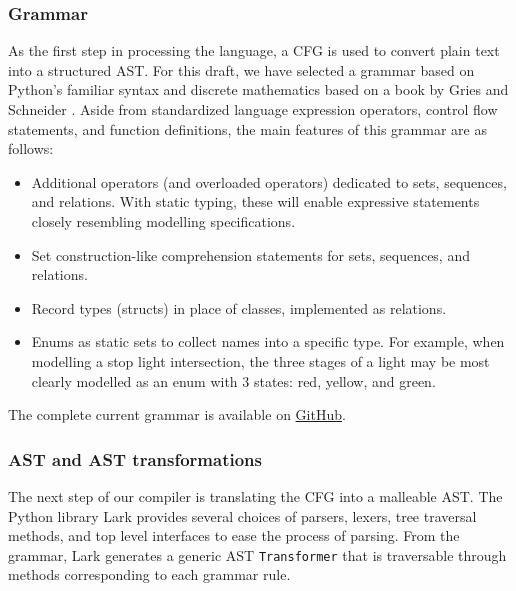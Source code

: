 \documentclass{article}
\begin{document}
\subsubsection{Grammar}


As the first step in processing the language, a CFG is used to convert plain text into a structured AST. For this draft, we have selected a grammar based on Python's familiar syntax \cite{pythonGrammar} and discrete mathematics based on a book by Gries and Schneider \cite{griesAndSchneider}. Aside from standardized language expression operators, control flow statements, and function definitions, the main features of this grammar are as follows:
\begin{itemize}
  \item Additional operators (and overloaded operators) dedicated to sets, sequences, and relations. With static typing, these will enable expressive statements closely resembling modelling specifications.
  \item Set construction-like comprehension statements for sets, sequences, and relations.
  \item Record types (structs) in place of classes, implemented as relations.
  \item Enums as static sets to collect names into a specific type. For example, when modelling a stop light intersection, the three stages of a light may be most clearly modelled as an enum with 3 states: red, yellow, and green.
\end{itemize}

The complete current grammar is available on \href{https://github.com/Ant13731/compilers/blob/main/implementation/grammar.lark}{GitHub}.

\subsubsection{AST and AST transformations}

The next step of our compiler is translating the CFG into a malleable AST. The Python library Lark \cite{lark} provides several choices of parsers, lexers, tree traversal methods, and top level interfaces to ease the process of parsing. From the grammar, Lark generates a generic AST \texttt{Transformer} that is traversable through methods corresponding to each grammar rule.
\end{document}
